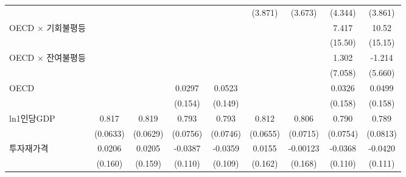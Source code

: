 \begin{table}[htbp]
{\begin{tabular}{l*{8}{c}}
                    &                     &                     &                     &                     &     (3.871)         &      (3.673)         &     (4.344)         &   (3.861)                        \\
[1em]
OECD $\times$ 기회불평등&        &        &       &                     &                     &                     &       7.417         &        10.52                     \\
                    &        &        &       &                     &                     &                     &     (15.50)         &      (15.15)                     \\
[1em]                                                                                                                                                     
OECD $\times$ 잔여불평등&        &        &       &                     &                     &                     &       1.302         &       -1.214                     \\
                    &        &        &       &                     &                     &                     &     (7.058)         &      (5.660)                     \\
[1em]
OECD              &                     &                     &      0.0297         &      0.0523         &                     &                     &      0.0326         &      0.0499         \\
                    &                     &                     &     (0.154)         &     (0.149)         &                     &                     &     (0.158)         &     (0.158)         \\
[1em]
ln1인당GDP        &       0.817\sym{***}&       0.819\sym{***}&       0.793\sym{***}&       0.793\sym{***}&       0.812\sym{***}&       0.806\sym{***}&       0.790\sym{***}&       0.789\sym{***}\\
                    &    (0.0633)         &    (0.0629)         &    (0.0756)         &    (0.0746)         &    (0.0655)         &    (0.0715)         &    (0.0754)         &    (0.0813)         \\
[1em]
투자재가격        &      0.0206         &      0.0205         &     -0.0387         &     -0.0359         &      0.0155         &    -0.00123         &     -0.0368         &     -0.0420         \\
                    &     (0.160)         &     (0.159)         &     (0.110)         &     (0.109)         &     (0.162)         &     (0.168)         &     (0.110)         &     (0.111)         \\

\end{tabular}}
\end{table}
